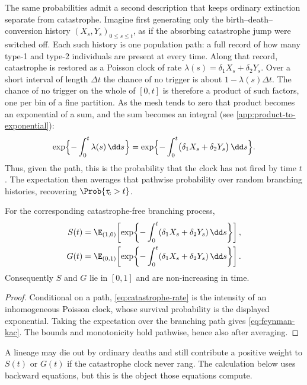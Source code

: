 The same probabilities admit a second description that keeps ordinary extinction separate from catastrophe. Imagine first generating only the birth--death--conversion history $(X_s,Y_s)_{0\le s\le t}$, as if the absorbing catastrophe jump were switched off. Each such history is one population path: a full record of how many type-1 and type-2 individuals are present at every time. Along that record, catastrophe is restored as a Poisson clock of rate $\lambda(s)=\delta_1X_s+\delta_2Y_s$. Over a short interval of length $\Delta t$ the chance of no trigger is about $1-\lambda(s)\Delta t$. The chance of no trigger on the whole of $[0,t]$ is therefore a product of such factors, one per bin of a fine partition. As the mesh tends to zero that product becomes an exponential of a sum, and the sum becomes an integral (see \cref{app:product-to-exponential}):
\[
\exp\Bigl\{-\int_0^t\lambda(s)\,\dd s\Bigr\}
=\exp\Bigl\{-\int_0^t\bigl(\delta_1X_s+\delta_2Y_s\bigr)\,\dd s\Bigr\}.
\]
Thus, given the path, this is the probability that the clock has not fired by time $t$. The expectation then averages that pathwise probability over random branching histories, recovering $\Prob\{\tau_{\!c}>t\}$.

\begin{proposition}
\label{prop:feynman-kac}
For the corresponding catastrophe-free branching process,
\begin{subequations}
\label{eq:feynman-kac}
\begin{align}
S(t)&=\E_{(1,0)}\!\left[
\exp\!\left\{-\int_0^t(\delta_1X_s+\delta_2Y_s)\,\dd s\right\}\right],\\
G(t)&=\E_{(0,1)}\!\left[
\exp\!\left\{-\int_0^t(\delta_1X_s+\delta_2Y_s)\,\dd s\right\}\right].
\end{align}
\end{subequations}
Consequently $S$ and $G$ lie in $[0,1]$ and are non-increasing in time.
\end{proposition}

\begin{proof}
Conditional on a path, \eqref{eq:catastrophe-rate} is the intensity of an inhomogeneous Poisson clock, whose survival probability is the displayed exponential. Taking the expectation over the branching path gives \cref{eq:feynman-kac}. The bounds and monotonicity hold pathwise, hence also after averaging.
\end{proof}

A lineage may die out by ordinary deaths and still contribute a positive weight to $S(t)$ or $G(t)$ if the catastrophe clock never rang. The calculation below uses backward equations, but this is the object those equations compute.

